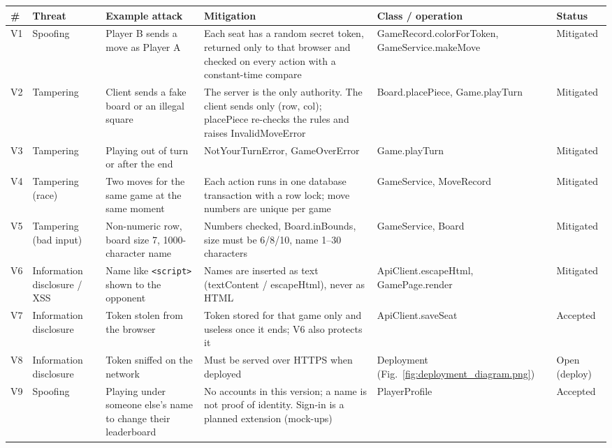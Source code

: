 \documentclass[11pt,a4paper]{article}
\begin{document}
\small
\begin{longtable}{>{\raggedright\arraybackslash}p{0.6cm} >{\raggedright\arraybackslash}p{2.0cm} >{\raggedright\arraybackslash}p{2.8cm} >{\raggedright\arraybackslash}p{4.0cm} >{\raggedright\arraybackslash}p{3.1cm} >{\raggedright\arraybackslash}p{1.6cm}}
\toprule
\textbf{\#} & \textbf{Threat} & \textbf{Example attack} & \textbf{Mitigation} & \textbf{Class / operation} & \textbf{Status}\\ \midrule\endhead
V1 & Spoofing & Player B sends a move as Player A & Each seat has a random secret token, returned only to that browser and checked on every action with a constant-time compare & GameRecord.colorForToken, GameService.makeMove & Mitigated\\
V2 & Tampering & Client sends a fake board or an illegal square & The server is the only authority. The client sends only (row, col); placePiece re-checks the rules and raises InvalidMoveError & Board.placePiece, Game.playTurn & Mitigated\\
V3 & Tampering & Playing out of turn or after the end & NotYourTurnError, GameOverError & Game.playTurn & Mitigated\\
V4 & Tampering (race) & Two moves for the same game at the same moment & Each action runs in one database transaction with a row lock; move numbers are unique per game & GameService, MoveRecord & Mitigated\\
V5 & Tampering (bad input) & Non-numeric row, board size 7, 1000-character name & Numbers checked, Board.inBounds, size must be 6/8/10, name 1--30 characters & GameService, Board & Mitigated\\
V6 & Information disclosure / XSS & Name like \texttt{<script>} shown to the opponent & Names are inserted as text (textContent / escapeHtml), never as HTML & ApiClient.escapeHtml, GamePage.render & Mitigated\\
V7 & Information disclosure & Token stolen from the browser & Token stored for that game only and useless once it ends; V6 also protects it & ApiClient.saveSeat & Accepted\\
V8 & Information disclosure & Token sniffed on the network & Must be served over HTTPS when deployed & Deployment (Fig.~\ref{fig:deployment_diagram.png}) & Open (deploy)\\
V9 & Spoofing & Playing under someone else's name to change their leaderboard & No accounts in this version; a name is not proof of identity. Sign-in is a planned extension (mock-ups) & PlayerProfile & Accepted\\

\end{longtable}
\end{document}
